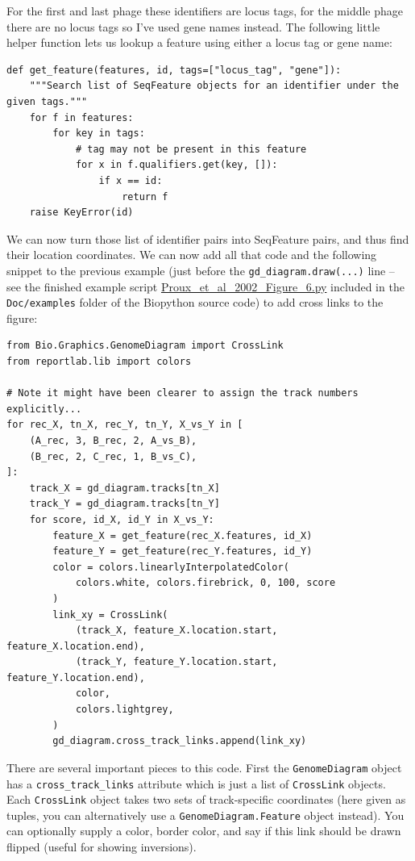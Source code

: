 For the first and last phage these identifiers are locus tags, for the middle
phage there are no locus tags so I've used gene names instead. The following
little helper function lets us lookup a feature using either a locus tag or
gene name:

\begin{verbatim}
def get_feature(features, id, tags=["locus_tag", "gene"]):
    """Search list of SeqFeature objects for an identifier under the given tags."""
    for f in features:
        for key in tags:
            # tag may not be present in this feature
            for x in f.qualifiers.get(key, []):
                if x == id:
                    return f
    raise KeyError(id)
\end{verbatim}

We can now turn those list of identifier pairs into SeqFeature pairs, and thus
find their location coordinates. We can now add all that code and the following
snippet to the previous example (just before the \verb|gd_diagram.draw(...)|
line -- see the finished example script
\href{https://github.com/biopython/biopython/blob/master/Doc/examples/Proux_et_al_2002_Figure_6.py}{Proux\_et\_al\_2002\_Figure\_6.py}
included in the \texttt{Doc/examples} folder of the Biopython source code)
to add cross links to the figure:

\begin{verbatim}
from Bio.Graphics.GenomeDiagram import CrossLink
from reportlab.lib import colors

# Note it might have been clearer to assign the track numbers explicitly...
for rec_X, tn_X, rec_Y, tn_Y, X_vs_Y in [
    (A_rec, 3, B_rec, 2, A_vs_B),
    (B_rec, 2, C_rec, 1, B_vs_C),
]:
    track_X = gd_diagram.tracks[tn_X]
    track_Y = gd_diagram.tracks[tn_Y]
    for score, id_X, id_Y in X_vs_Y:
        feature_X = get_feature(rec_X.features, id_X)
        feature_Y = get_feature(rec_Y.features, id_Y)
        color = colors.linearlyInterpolatedColor(
            colors.white, colors.firebrick, 0, 100, score
        )
        link_xy = CrossLink(
            (track_X, feature_X.location.start, feature_X.location.end),
            (track_Y, feature_Y.location.start, feature_Y.location.end),
            color,
            colors.lightgrey,
        )
        gd_diagram.cross_track_links.append(link_xy)
\end{verbatim}

There are several important pieces to this code. First the \verb|GenomeDiagram| object
has a \verb|cross_track_links| attribute which is just a list of \verb|CrossLink| objects.
Each \verb|CrossLink| object takes two sets of track-specific coordinates (here given
as tuples, you can alternatively use a \verb|GenomeDiagram.Feature| object instead).
You can optionally supply a color, border color, and say if this link should be drawn
flipped (useful for showing inversions).

